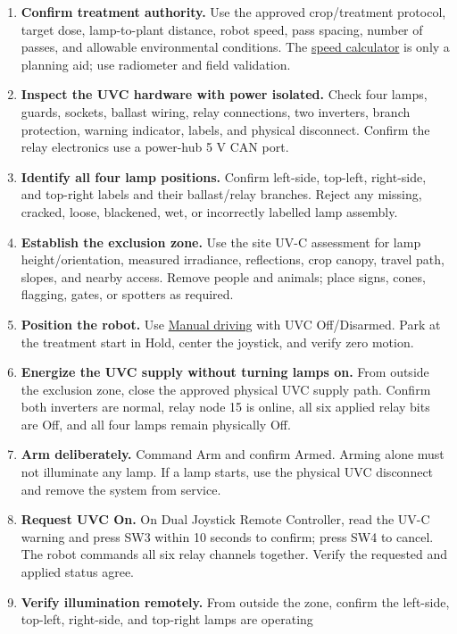 \documentclass[
  10pt,
  letterpaper,
  openany]{report}
\providecommand{\tightlist}{%
  \setlength{\itemsep}{0pt}\setlength{\parskip}{0pt}}
\begin{document}
\begin{enumerate}
\tightlist
\item
  \textbf{Confirm treatment authority.} Use the approved crop/treatment
  protocol, target dose, lamp-to-plant distance, robot speed, pass
  spacing, number of passes, and allowable environmental conditions. The
  \hyperref[uvc-calculator]{speed calculator} is only a planning aid;
  use radiometer and field validation.
\item
  \textbf{Inspect the UVC hardware with power isolated.} Check four
  lamps, guards, sockets, ballast wiring, relay connections, two
  inverters, branch protection, warning indicator, labels, and physical
  disconnect. Confirm the relay electronics use a power-hub 5 V CAN
  port.
\item
  \textbf{Identify all four lamp positions.} Confirm left-side,
  top-left, right-side, and top-right labels and their ballast/relay
  branches. Reject any missing, cracked, loose, blackened, wet, or
  incorrectly labelled lamp assembly.
\item
  \textbf{Establish the exclusion zone.} Use the site UV-C assessment
  for lamp height/orientation, measured irradiance, reflections, crop
  canopy, travel path, slopes, and nearby access. Remove people and
  animals; place signs, cones, flagging, gates, or spotters as required.
\item
  \textbf{Position the robot.} Use \hyperref[operations-manual]{Manual
  driving} with UVC Off/Disarmed. Park at the treatment start in Hold,
  center the joystick, and verify zero motion.
\item
  \textbf{Energize the UVC supply without turning lamps on.} From
  outside the exclusion zone, close the approved physical UVC supply
  path. Confirm both inverters are normal, relay node 15 is online, all
  six applied relay bits are Off, and all four lamps remain physically
  Off.
\item
  \textbf{Arm deliberately.} Command Arm and confirm Armed. Arming alone
  must not illuminate any lamp. If a lamp starts, use the physical UVC
  disconnect and remove the system from service.
\item
  \textbf{Request UVC On.} On Dual Joystick Remote Controller, read the
  UV-C warning and press SW3 within 10 seconds to confirm; press SW4 to
  cancel. The robot commands all six relay channels together. Verify the
  requested and applied status agree.
\item
  \textbf{Verify illumination remotely.} From outside the zone, confirm
  the left-side, top-left, right-side, and top-right lamps are operating

\end{enumerate}
\end{document}
